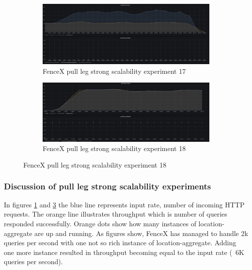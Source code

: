 \documentclass[a4]{report}
\begin{document}
    \begin{figure}
        \centering
        \begin{subfigure}[b]{\textwidth}
            \centering
            \caption{FenceX pull leg strong scalability experiment 17}
            \label{fig:ex17}
            \includegraphics[width=\textwidth, height=0.35\textheight, scale=2]{images/evaluation/ex17-benchmarking-ongoing-2per4sec.png}
        \end{subfigure}

        \begin{subfigure}[b]{\textwidth}
            \centering
            \caption{FenceX pull leg strong scalability experiment 18}
            \label{fig:ex18}
            \includegraphics[width=\textwidth, height=0.35\textheight, scale=2]{images/evaluation/ex18-benchmarking-ongoing-2per4sec.png}
        \end{subfigure}
    \end{figure}

    \clearpage

    \subsubsection{Discussion of pull leg strong scalability experiments}
    In figures \ref{fig:ex17} and \ref{fig:ex18} the blue line represents input rate, number of incoming HTTP
    requests.
    The orange line illustrates throughput which is number of queries responded successfully.
    Orange dots show how many instances of location-aggregate are up and running.
    As figures show, FenceX has managed to handle 2k queries per second with one not so rich instance of location-aggregate.
    Adding one more instance resulted in throughput becoming equal to the input rate (~6K queries per second).
\end{document}
